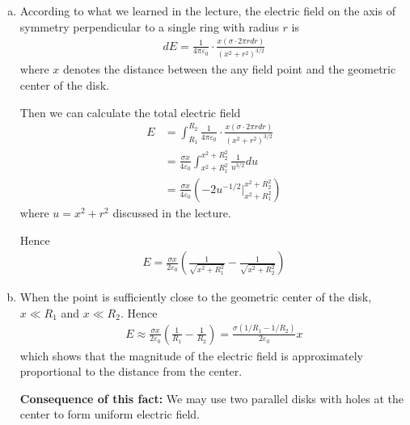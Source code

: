 \documentclass[12pt,a4paper]{article}
\begin{document}
\begin{enumerate}[(a)]
    \item According to what we learned in the lecture, the electric field on the axis of symmetry perpendicular to a single ring with radius $r$ is
    \begin{align}
        dE = \frac{1}{4\pi\varepsilon_0} \cdot \frac{x(\sigma\cdot 2\pi r dr)}{(x^2+r^2)^{3/2}}
    \end{align}
    where $x$ denotes the distance between the any field point and the geometric center of the disk.
    
    Then we can calculate the total electric field
    \begin{align*}
        E &= \int_{R_1}^{R_2} \frac{1}{4\pi\varepsilon_0} \cdot \frac{x(\sigma\cdot 2\pi r dr)}{(x^2+r^2)^{3/2}} \\
        &= \frac{\sigma x}{4\varepsilon_0} \int_{x^2+R_1 ^2}^{x^2+R_2 ^2} \frac{1}{u^{3/2}} du  \\
        &= \frac{\sigma x}{4\varepsilon_0} \left(  -2u^{-1/2} \bigg|_{x^2+R_1 ^2}^{x^2+R_2 ^2} \right)
    \end{align*}
    where $u=x^2+r^2$ discussed in the lecture.
    
    Hence
    \begin{align}
        E = \frac{\sigma x}{2\varepsilon_0} \left( \frac{1}{\sqrt{x^2+R_1 ^2}} - \frac{1}{\sqrt{x^2+R_2 ^2}} \right)
    \end{align}
    
    \item When the point is sufficiently close to the geometric center of the disk, $x \ll R_1$ and $x \ll R_2$. Hence
    \begin{align}
        E \approx \frac{\sigma x}{2\varepsilon_0} \left( \frac{1}{R_1} - \frac{1}{R_2} \right) = \frac{\sigma (1/R_1 - 1/R_2)}{2\varepsilon_0}x
    \end{align}
    which shows that the magnitude of the electric field is approximately proportional to the distance from the center.
    
    \textbf{Consequence of this fact:} We may use two parallel disks with holes at the center to form uniform electric field.
    
\end{enumerate}
\end{document}
